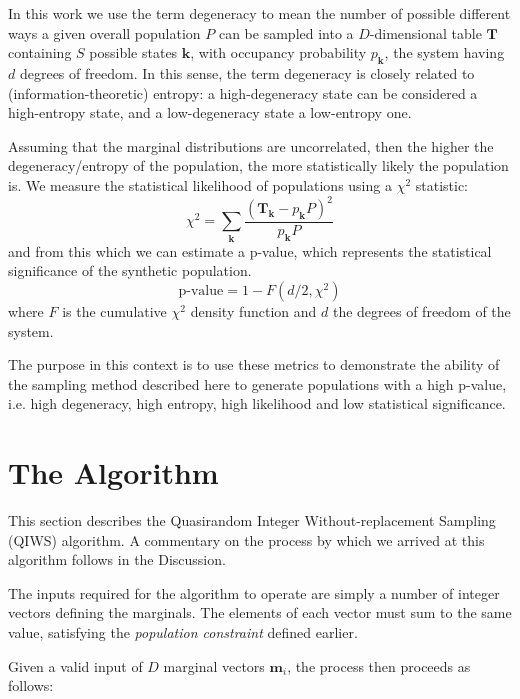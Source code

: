 \documentclass{JASSS}
\begin{document}
In this work we use the term degeneracy to mean the number of possible different
ways a given overall population \(P\) can be sampled into a \(D\)-dimensional table
\(\mathbf{T}\) containing \(S\) possible states \(\mathbf{k}\), with
occupancy probability \(p_\mathbf{k}\), the system having \(d\) degrees
of freedom. In this sense, the term degeneracy is closely related to (information-theoretic) entropy:
a high-degeneracy state can be considered a high-entropy state, and a low-degeneracy state a low-entropy one. 

Assuming that the marginal distributions are uncorrelated, then the
higher the degeneracy/entropy of the population, the more statistically likely
the population is. We measure the statistical likelihood of populations using a \(\chi^2\) statistic:
\begin{equation}
\chi^2 = \sum\limits_{\mathbf{k}}\frac{(\mathbf{T}_\mathbf{k}-p_\mathbf{k}P)^2}{p_\mathbf{k}P}
\label{eqn:chi2}
\end{equation}
and from this which we can estimate a p-value, which represents the statistical
significance of the synthetic population.
\begin{equation}
\text{p-value}=1-F(d/2,\chi^2) 
\end{equation}
where \(F\) is the cumulative
\(\chi^2\) density function and \(d\) the degrees of freedom of the
system. 

The purpose in this context is to use these metrics to demonstrate the ability of the sampling method described here to generate populations with a high p-value, i.e. high degeneracy, high entropy, high likelihood and low statistical significance.

\section{The Algorithm}\label{the-algorithm}

This section describes the Quasirandom Integer Without-replacement Sampling (QIWS) algorithm. A commentary on the process by which we arrived at this algorithm follows in the Discussion.

The inputs required for the algorithm to operate are simply a number of integer vectors defining the marginals. The elements of each vector must sum to the same value, satisfying the \emph{population constraint} defined earlier.

Given a valid input of \(D\) marginal vectors \(\mathbf{m}_i\), the process then proceeds as follows:
\end{document}
